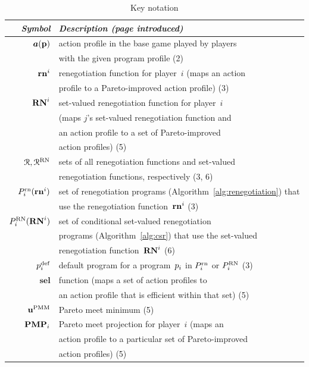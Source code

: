 \documentclass[sigconf]{aamas}
\newcommand{\selection}{sel}%
\newcommand{\renegb}{\mathbf{\selection}}
\theoremstyle{definition}
\begin{document}
\begin{table}[ht]
	\caption{Key notation}
	\label{tab:notation}
	\begin{tabular}{rl}\toprule
		\textit{Symbol} & \textit{Description (page introduced)} \\ \midrule
         $\boldsymbol{a}(\textbf{p})$ & action profile in the base game played by players \\
         & with the given program profile (2) \\
         $\mathbf{rn}^i$ & renegotiation function for player~$i$ (maps an action \\
         & profile to a Pareto-improved action profile) (3) \\
		  $\mathbf{RN}^{i}$ & set-valued renegotiation function for player~$i$  \\ & (maps $j$'s set-valued renegotiation function and  \\
    & an action profile to a set of Pareto-improved  \\
    & action profiles) (5) \\
    $\mathcal{R}, \mathcal{R}^{\textnormal{RN}}$ & sets of all renegotiation functions and set-valued \\
    & renegotiation functions, respectively (3, 6) \\
        $P_i^{\textnormal{rn}}(\mathbf{rn}^i)$ & set of renegotiation programs (Algorithm~\ref{alg:renegotiation}) that \\
        & use the renegotiation function~$\mathbf{rn}^i$ (3)\\
        $P_i^{\textnormal{RN}}(\mathbf{RN}^{i})$ & set of conditional set-valued renegotiation \\
        & programs (Algorithm~\ref{alg:csr}) that use the set-valued \\
        &  renegotiation function~$\mathbf{RN}^{i}$ (6)\\
        $p_i^{\textnormal{def}}$ & default program for a program~$p_i$ in $P_i^{\textnormal{rn}}$ or $ P_i^{\textnormal{RN}}$ (3)\\
        $\renegb$ & \selfunction{} function (maps a set of action profiles to \\ &an action profile that is efficient within that set) (5) \\
        $\textbf{u}^{\textnormal{PMM}} $ & Pareto meet minimum (5) \\
        $\mathbf{PMP}_i$ & Pareto meet projection for player~$i$ (maps an  \\
        & action profile to a particular set of Pareto-improved
         \\
        & action profiles) (5) \\ \bottomrule
	\end{tabular}
\end{table}
\end{document}
